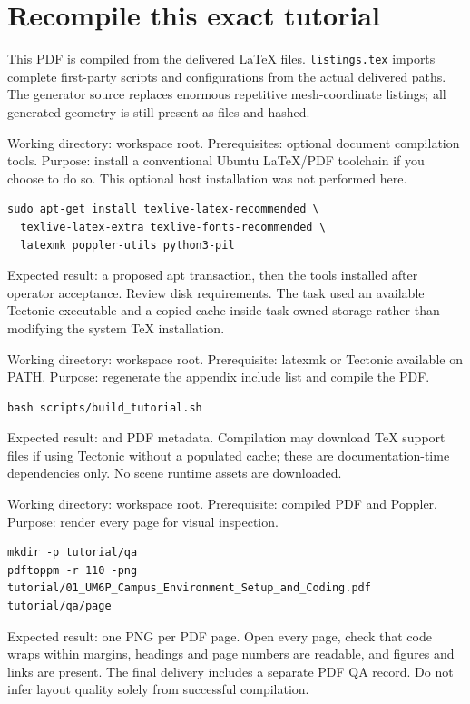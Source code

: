 \section{Recompile this exact tutorial}
This PDF is compiled from the delivered LaTeX files. \texttt{listings.tex} imports complete first-party scripts and configurations from the actual delivered paths. The generator source replaces enormous repetitive mesh-coordinate listings; all generated geometry is still present as files and hashed.

Working directory: workspace root. Prerequisites: optional document compilation tools. Purpose: install a conventional Ubuntu LaTeX/PDF toolchain if you choose to do so. This optional host installation was not performed here.
\begin{lstlisting}
sudo apt-get install texlive-latex-recommended \
  texlive-latex-extra texlive-fonts-recommended \
  latexmk poppler-utils python3-pil
\end{lstlisting}
Expected result: a proposed apt transaction, then the tools installed after operator acceptance. Review disk requirements. The task used an available Tectonic executable and a copied cache inside task-owned storage rather than modifying the system TeX installation.

Working directory: workspace root. Prerequisite: latexmk or Tectonic available on PATH. Purpose: regenerate the appendix include list and compile the PDF.
\begin{lstlisting}
bash scripts/build_tutorial.sh
\end{lstlisting}
Expected result:  and PDF metadata. Compilation may download TeX support files if using Tectonic without a populated cache; these are documentation-time dependencies only. No scene runtime assets are downloaded.

Working directory: workspace root. Prerequisite: compiled PDF and Poppler. Purpose: render every page for visual inspection.
\begin{lstlisting}
mkdir -p tutorial/qa
pdftoppm -r 110 -png tutorial/01_UM6P_Campus_Environment_Setup_and_Coding.pdf tutorial/qa/page
\end{lstlisting}
Expected result: one PNG per PDF page. Open every page, check that code wraps within margins, headings and page numbers are readable, and figures and links are present. The final delivery includes a separate PDF QA record. Do not infer layout quality solely from successful compilation.

